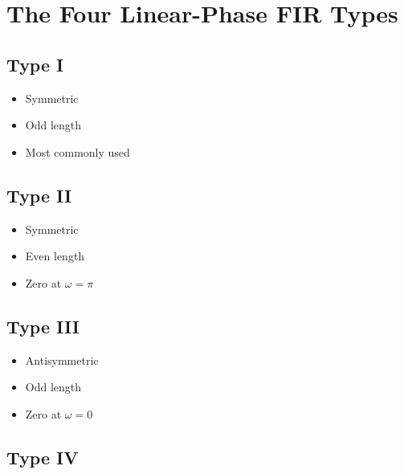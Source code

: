 \section{The Four Linear-Phase FIR Types}


\subsection{Type I}

\begin{itemize}
\item Symmetric
\item Odd length
\item Most commonly used
\end{itemize}


\subsection{Type II}

\begin{itemize}
\item Symmetric
\item Even length
\item Zero at \(\omega=\pi\)
\end{itemize}


\subsection{Type III}

\begin{itemize}
\item Antisymmetric
\item Odd length
\item Zero at \(\omega=0\)
\end{itemize}


\subsection{Type IV}

